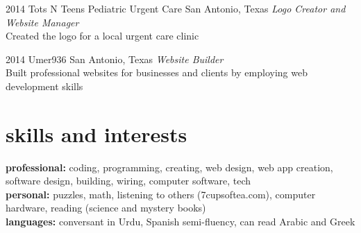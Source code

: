 \documentclass[]{friggeri-cv} %
\begin{document}
\begin{entrylist}

	\entry
	{2014}
	{Tots N Teens Pediatric Urgent Care}
	{San Antonio, Texas}
	{\emph{Logo Creator and Website Manager} \\
	Created the logo for a local urgent care clinic}


	\entry
	{2014}
	{Umer936}
	{San Antonio, Texas}
	{\emph{Website Builder} \\
	Built professional websites for businesses and clients by employing web development skills}

\end{entrylist}


\section{skills and interests}

\textbf{professional:} coding, programming, creating, web design, web app creation, software design, building, wiring, computer software, tech
\\
\textbf{personal:} puzzles, math, listening to others (7cupsoftea.com), computer hardware, reading (science and mystery books)   \\
\textbf{languages:} conversant in Urdu, Spanish semi-fluency, can read Arabic and Greek
\end{document}
